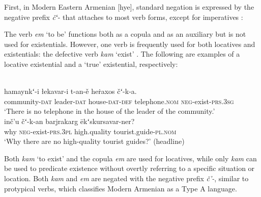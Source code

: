 ﻿\documentclass[output=paper]{langsci/langscibook}
\begin{document}
First, in Modern Eastern Armenian [hye], standard negation is
expressed by the negative prefix \textit{čʻ}- that attaches to most verb
forms, except for imperatives \parencite[522]{DumTragut2009}:
%
    \begin{exe}\end{exe}
%
The verb \textit{em} `to be' functions both as a copula and as an auxiliary
\parencite[215]{DumTragut2009} but is not used for existentials. However,
one verb is frequently used for both locatives and existentials: the
defective verb \textit{kam} `exist' \parencite[282]{DumTragut2009}. The following are examples of a locative existential and a `true' existential, respectively:
%
\begin{exe}
\ex
{}\\
    \gll hamaynkʻ-i łekavar-i t-an-ě heṙaxos čʻ-k-a.  \\
community-\textsc{dat} leader-\textsc{dat} house-\textsc{dat-def}
telephone.\textsc{nom} \textsc{neg}-exist-\textsc{prs.3sg} \\
\glt `There is no telephone in the house of the leader of the community.' 
\ex
{}\\
    \gll inč’u čʻ-k-an barjrakarg ēkʻskursavar-ner?  \\
why \textsc{neg}-exist-\textsc{prs.3pl} high.quality
tourist.guide-\textsc{pl.nom} \\
    \glt `Why there are no high-quality tourist guides?' (headline)
    \end{exe}
%
Both \textit{kam} `to exist' and the copula \textit{em} are used for locatives, while only \textit{kam} can be used to predicate existence without overtly referring to a specific situation or location. Both \textit{kam} and \textit{em} are negated with the negative prefix \textit{č’-}, similar to protypical verbs, which classifies Modern Armenian as a Type A language. 
\end{document}
